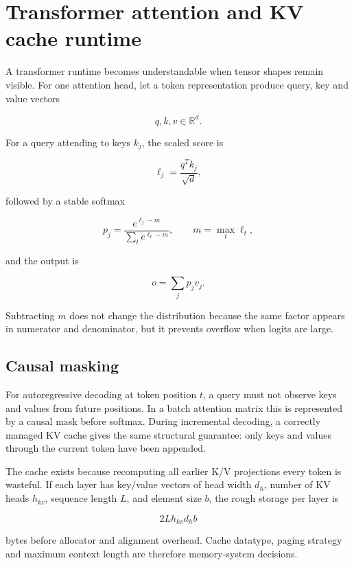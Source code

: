 \hypertarget{appendix-ea2dadd21ce5}{}\label{referencestart:appendix-ea2dadd21ce5}
\section{Transformer attention and KV cache runtime}\label{appendix-ea2dadd21ce5-transformer-attention-and-kv-cache-runtime}

A transformer runtime becomes understandable when tensor shapes remain visible. For one attention head, let a token representation produce query, key and value vectors

\[
q,k,v \in \mathbb{R}^{d}.
\]

For a query attending to keys \(k_j\), the scaled score is

\[
\ell_j = \frac{q^T k_j}{\sqrt{d}},
\]

followed by a stable softmax

\[
p_j = \frac{e^{\ell_j-m}}{\sum_t e^{\ell_t-m}},
\qquad m=\max_t \ell_t,
\]

and the output is

\[
o = \sum_j p_j v_j.
\]

Subtracting \(m\) does not change the distribution because the same factor appears in numerator and denominator, but it prevents overflow when logits are large.

\subsection{Causal masking}\label{appendix-ea2dadd21ce5-causal-masking}

For autoregressive decoding at token position \(t\), a query must not observe keys and values from future positions. In a batch attention matrix this is represented by a causal mask before softmax. During incremental decoding, a correctly managed KV cache gives the same structural guarantee: only keys and values through the current token have been appended.

The cache exists because recomputing all earlier K/V projections every token is wasteful. If each layer has key/value vectors of head width \(d_h\), number of KV heads \(h_{kv}\), sequence length \(L\), and element size \(b\), the rough storage per layer is

\[
2 L h_{kv} d_h b
\]

bytes before allocator and alignment overhead. Cache datatype, paging strategy and maximum context length are therefore memory-system decisions.

